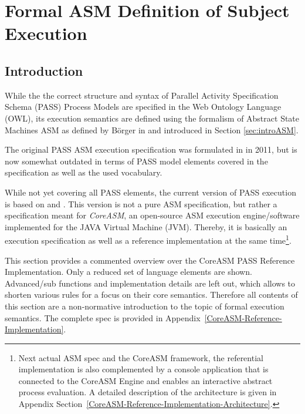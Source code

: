 \section{Formal ASM Definition of Subject Execution}
\label{sec:PASSExec}


\subsection{Introduction}

While the the correct structure and syntax of Parallel Activity Specification Schema (PASS) Process Models are specified in the Web Ontology Language (OWL), its execution semantics are defined using the formalism of Abstract State Machines ASM as defined by Börger in \cite{book:ASM-2003} and introduced in Section \ref{sec:introASM}.

The original PASS ASM execution specification was formulated in \cite{boerger2011interpreter} in 2011, but is now somewhat outdated in terms of PASS model elements covered in the specification as well as the used vocabulary. 

While not yet covering all PASS elements, the current version of PASS execution is based on \cite{article:PASS-ASM} and \cite{article:PASS-CoreASM}. This version is not a pure ASM specification, but rather a specification meant for \textit{CoreASM}, an open-source ASM execution engine/software implemented for the JAVA Virtual Machine (JVM)\cite{Farahbod2011}. Thereby, it is basically an execution specification as well as a reference implementation at the same time\footnote{Next actual ASM spec and the CoreASM framework, the referential implementation is also complemented by a console application that is connected to the CoreASM Engine and enables an interactive abstract process evaluation. A detailed description of the architecture is given in Appendix Section~\ref{CoreASM-Reference-Implementation-Architecture}.}.

This section provides a commented overview over the CoreASM PASS Reference Implementation. Only a reduced set of language elements are shown. Advanced/sub functions and implementation details are left out, which allows to shorten various rules for a focus on their core semantics. Therefore all contents of this section are a non-normative introduction to the topic of formal execution semantics. The complete spec is provided in Appendix~\ref{CoreASM-Reference-Implementation}. 


